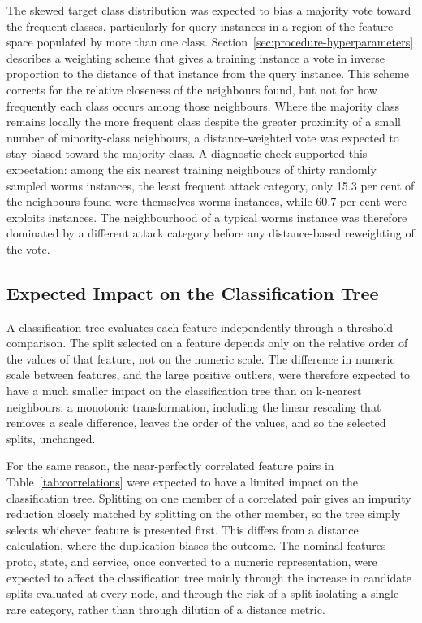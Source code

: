 \documentclass[10pt,conference]{IEEEtran}
\begin{document}
The skewed target class distribution was expected to bias a majority vote toward the frequent classes, particularly for query instances in a region of the feature space populated by more than one class. Section~\ref{sec:procedure-hyperparameters} describes a weighting scheme that gives a training instance a vote in inverse proportion to the distance of that instance from the query instance. This scheme corrects for the relative closeness of the neighbours found, but not for how frequently each class occurs among those neighbours. Where the majority class remains locally the more frequent class despite the greater proximity of a small number of minority-class neighbours, a distance-weighted vote was expected to stay biased toward the majority class. A diagnostic check supported this expectation: among the six nearest training neighbours of thirty randomly sampled worms instances, the least frequent attack category, only 15.3 per cent of the neighbours found were themselves worms instances, while 60.7 per cent were exploits instances. The neighbourhood of a typical worms instance was therefore dominated by a different attack category before any distance-based reweighting of the vote.

\subsection{Expected Impact on the Classification Tree}
\label{sec:methodology-impact-tree}

A classification tree evaluates each feature independently through a threshold comparison. The split selected on a feature depends only on the relative order of the values of that feature, not on the numeric scale. The difference in numeric scale between features, and the large positive outliers, were therefore expected to have a much smaller impact on the classification tree than on k-nearest neighbours: a monotonic transformation, including the linear rescaling that removes a scale difference, leaves the order of the values, and so the selected splits, unchanged.

For the same reason, the near-perfectly correlated feature pairs in Table~\ref{tab:correlations} were expected to have a limited impact on the classification tree. Splitting on one member of a correlated pair gives an impurity reduction closely matched by splitting on the other member, so the tree simply selects whichever feature is presented first. This differs from a distance calculation, where the duplication biases the outcome. The nominal features proto, state, and service, once converted to a numeric representation, were expected to affect the classification tree mainly through the increase in candidate splits evaluated at every node, and through the risk of a split isolating a single rare category, rather than through dilution of a distance metric.
\end{document}
